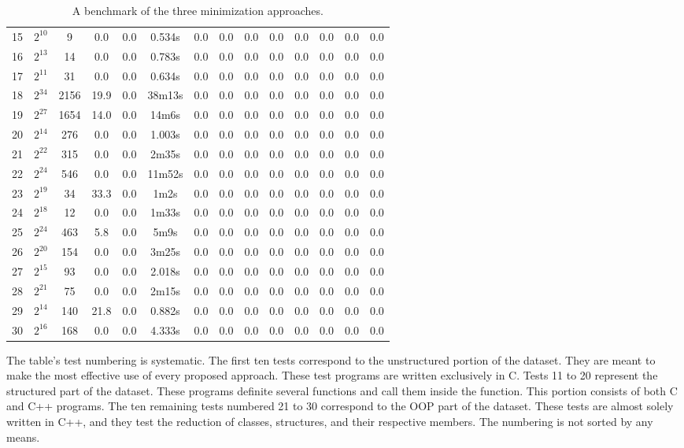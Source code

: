 \begin{table}[b!]
\begin{tabular}{SSSSSSSSSSSSSS}
    15 & {$2^{10}$} & 9 & 0.0 & 0.0 & 0.534s & 0.0 & 0.0 & 0.0 & 0.0 & 0.0 & 0.0 & 0.0 & 0.0  \\
    16 & {$2^{13}$} & 14 & 0.0 & 0.0 & 0.783s & 0.0 & 0.0 & 0.0 & 0.0 & 0.0 & 0.0 & 0.0 & 0.0  \\
    17 & {$2^{11}$} & 31 & 0.0 & 0.0 & 0.634s & 0.0 & 0.0 & 0.0 & 0.0 & 0.0 & 0.0 & 0.0 & 0.0  \\
    18 & {$2^{34}$} & 2156 & 19.9 & 0.0 & 38m13s & 0.0 & 0.0 & 0.0 & 0.0 & 0.0 & 0.0 & 0.0 & 0.0  \\
    19 & {$2^{27}$} & 1654 & 14.0 & 0.0 & 14m6s & 0.0 & 0.0 & 0.0 & 0.0 & 0.0 & 0.0 & 0.0 & 0.0  \\
    20 & {$2^{14}$} & 276 & 0.0 & 0.0 & 1.003s & 0.0 & 0.0 & 0.0 & 0.0 & 0.0 & 0.0 & 0.0 & 0.0  \\  & {$2^{22}$} & 315 & 0.0 & 0.0 & 2m35s & 0.0 & 0.0 & 0.0 & 0.0 & 0.0 & 0.0 & 0.0 & 0.0  \\
    22 & {$2^{24}$} & 546 & 0.0 & 0.0 & 11m52s & 0.0 & 0.0 & 0.0 & 0.0 & 0.0 & 0.0 & 0.0 & 0.0  \\
    23 & {$2^{19}$} & 34 & 33.3 & 0.0 & 1m2s & 0.0 & 0.0 & 0.0 & 0.0 & 0.0 & 0.0 & 0.0 & 0.0  \\
    24 & {$2^{18}$} & 12 & 0.0 & 0.0 & 1m33s & 0.0 & 0.0 & 0.0 & 0.0 & 0.0 & 0.0 & 0.0 & 0.0  \\
    25 & {$2^{24}$} & 463 & 5.8 & 0.0 & 5m9s & 0.0 & 0.0 & 0.0 & 0.0 & 0.0 & 0.0 & 0.0 & 0.0  \\
    26 & {$2^{20}$} & 154 & 0.0 & 0.0 & 3m25s & 0.0 & 0.0 & 0.0 & 0.0 & 0.0 & 0.0 & 0.0 & 0.0  \\
    27 & {$2^{15}$} & 93 & 0.0 & 0.0 & 2.018s & 0.0 & 0.0 & 0.0 & 0.0 & 0.0 & 0.0 & 0.0 & 0.0  \\
    28 & {$2^{21}$} & 75 & 0.0 & 0.0 & 2m15s & 0.0 & 0.0 & 0.0 & 0.0 & 0.0 & 0.0 & 0.0 & 0.0  \\
    29 & {$2^{14}$} & 140 & 21.8 & 0.0 & 0.882s & 0.0 & 0.0 & 0.0 & 0.0 & 0.0 & 0.0 & 0.0 & 0.0  \\
    30 & {$2^{16}$} & 168 & 0.0 & 0.0 & 4.333s & 0.0 & 0.0 & 0.0 & 0.0 & 0.0 & 0.0 & 0.0 & 0.0  \\ \bottomrule
\end{tabular}
\caption{A benchmark of the three minimization approaches.}
\label{tab:results}
\end{table}

The table's test numbering is systematic. 
The first ten tests correspond to the unstructured portion of the dataset. 
They are meant to make the most effective use of every proposed approach. 
These test programs are written exclusively in C. Tests 11 to 20 represent 
the structured part of the dataset. 
These programs definite several functions and call them inside 
the  function. 
This portion consists of both C and C++ programs.
The ten remaining tests numbered 21 to 30 correspond to the OOP part of 
the dataset. 
These tests are almost solely written in C++, and they test the reduction 
of classes, structures, and their respective members.
The numbering is not sorted by any means.

